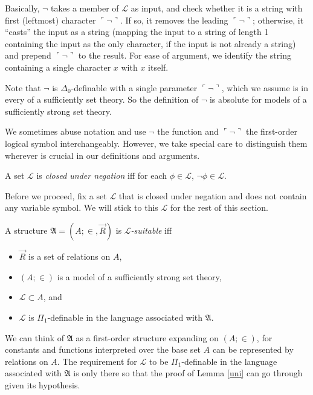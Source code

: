 \documentclass[12pt]{article}
\numberwithin{equation}{section}
\begin{document}
Basically, $\neg$ takes a member of $\mathcal{L}$ as input, and check whether it is a string with first (leftmost) character $\ulcorner \neg \urcorner$. If so, it removes the leading $\ulcorner \neg \urcorner$; otherwise, it ``casts'' the input as a string (mapping the input to a string of length 1 containing the input as the only character, if the input is not already a string) and prepend $\ulcorner \neg \urcorner$ to the result. For ease of argument, we identify the string containing a single character $x$ with $x$ itself. 

Note that $\neg$ is $\Delta_0$-definable with a single parameter $\ulcorner \neg \urcorner$, which we assume is in every of a sufficiently set theory. So the definition of $\neg$ is absolute for models of a sufficiently strong set theory.

We sometimes abuse notation and use $\neg$ the function and $\ulcorner \neg \urcorner$ the first-order logical symbol interchangeably. However, we take special care to distinguish them wherever is crucial in our definitions and arguments.

\begin{defi}
A set $\mathcal{L}$ is \emph{closed under negation} iff for each $\phi \in \mathcal{L}$, $\neg \phi \in \mathcal{L}$.
\end{defi}

Before we proceed, fix a set $\mathcal{L}$ that is closed under negation and does not contain any variable symbol. We will stick to this $\mathcal{L}$ for the rest of this section.

\begin{defi}\label{lsuitable}
A structure $\mathfrak{A} = (A; \in, \Vec{R})$ is $\mathcal{L}$\emph{-suitable} iff
\begin{itemize}
    \item $\Vec{R}$ is a set of relations on $A$,
    \item $(A; \in)$ is a model of a sufficiently strong set theory,
    \item $\mathcal{L} \subset A$, and
    \item $\mathcal{L}$ is $\Pi_1$-definable in the language associated with $\mathfrak{A}$.
\end{itemize}
\end{defi}

We can think of $\mathfrak{A}$ as a first-order structure expanding on $(A; \in)$, for constants and functions interpreted over the base set $A$ can be represented by relations on $A$. The requirement for $\mathcal{L}$ to be $\Pi_1$-definable in the language associated with $\mathfrak{A}$ is only there so that the proof of Lemma \ref{uni} can go through given its hypothesis.
\end{document}
